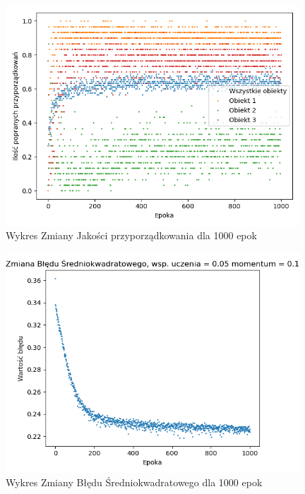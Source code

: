 \documentclass[12pt]{article}
\begin{document}
\newpage

\begin{figure}[!ht]
 \centering
 \includegraphics[width=11cm]{WykresPrzyporzadkowania20neuron1wejscia1.png}
 \caption{Wykres Zmiany Jakości przyporządkowania dla 1000 epok}
 \vspace{-0.1cm}
 \label{WykresPrzyp10}
\end{figure}


\begin{figure}[!ht]
 \centering
 \includegraphics[width=11cm]{WykresBlad20neuron1wejscia1.png}
 \caption{Wykres Zmiany Błędu Średniokwadratowego dla 1000 epok}
 \vspace{-0.1cm}
 \label{WykresBlad10}
\end{figure}
\newpage 
\end{document}
